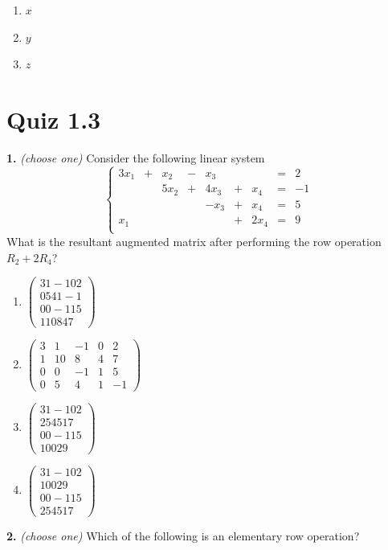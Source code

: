 \documentclass[10pt,a4paper]{article}
\begin{document}
\begin{enumerate}[label=(\Alph*)]
\item \(x\)
\item \(y\)
\item \(z\)
\end{enumerate}
\smallskip
\section{Quiz 1.3}
\textbf{1.} \textit{(choose one)} Consider the following linear system \[\left\{\begin{array}{rrrrrrrrr} 3x_1&+&x_2&-&x_3&&&=&2\\ &&5x_2&+&4x_3&+&x_4&=&-1\\ &&&&-x_3&+&x_4&=&5\\ x_1&&&&&+&2x_4&=&9\\ \end{array}\right.\] What is the resultant augmented matrix after performing the row operation \(R_2+2R_4\)?

\begin{enumerate}[label=(\Alph*)]
\item \(\left(\begin{array}{cccc|c} 31-102\\ 0541-1\\ 00-115\\ 110847 \end{array}\right)\)
\item \(\left(\begin{array}{cccc|c} 3&1&-1&0&2\\ 1&10&8&4&7\\ 0&0&-1&1&5\\ 0&5&4&1&-1 \end{array}\right)\)
\item \(\left(\begin{array}{cccc|c} 31-102\\ 254517\\ 00-115\\ 10029 \end{array}\right)\)
\item \(\left(\begin{array}{cccc|c} 31-102\\ 10029\\ 00-115\\ 254517 \end{array}\right)\)
\end{enumerate}
\smallskip
\textbf{2.} \textit{(choose one)} Which of the following is an elementary row operation?
\end{document}

